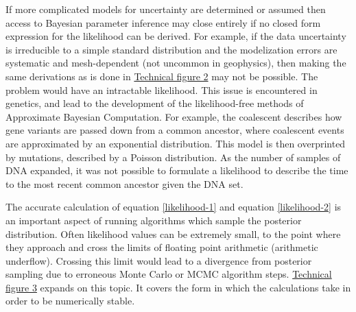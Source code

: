 If more complicated models for uncertainty are determined or assumed then access to Bayesian parameter inference may close entirely if no closed form expression for the likelihood can be derived. For example, if the data uncertainty is irreducible to a simple standard distribution and the modelization errors are systematic and mesh-dependent (not uncommon in geophysics), then making the same derivations as is done in \hyperref[tf1]{Technical figure 2} may not be possible. The problem would have an intractable likelihood. This issue is encountered in genetics, and lead to the development of the likelihood-free methods of Approximate Bayesian Computation. For example, the coalescent \citep{Marjoram2006} describes how gene variants are passed down from a common ancestor, where coalescent events are approximated by an exponential distribution. This model is then overprinted by mutations, described by a Poisson distribution. As the number of samples of DNA expanded, it was not possible to formulate a likelihood to describe the time to the most recent common ancestor given the DNA set.\par



The accurate calculation of equation \ref{likelihood-1} and equation \ref{likelihood-2} is an important aspect of running algorithms which sample the posterior distribution. Often likelihood values can be extremely small, to the point where they approach and cross the limits of floating point arithmetic (arithmetic underflow). Crossing this limit would lead to a divergence from posterior sampling due to erroneous Monte Carlo or MCMC algorithm steps. \hyperref[tf3]{Technical figure 3} expands on this topic. It covers the form in which the calculations take in order to be numerically stable.\par

